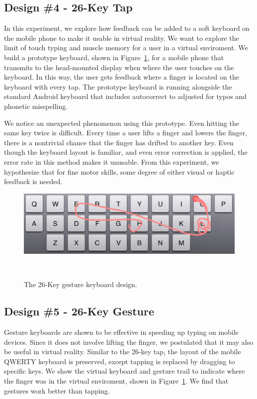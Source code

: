 \subsection{Design \#4 - 26-Key Tap}

In this experiment, we explore how feedback can be added to a soft keyboard on the mobile phone to make it usable in virtual reality.
We want to explore the limit of touch typing and muscle memory for a user in a virtual enviroment.
We build a prototype keyboard, shown in Figure~\ref{fig:gesture}, for a mobile phone that transmits to the head-mounted display when where the user touches on the keyboard.
In this way, the user gets feedback where a finger is located on the keyboard with every tap.
The prototype keyboard is running alongside the standard Android keyboard that includes autocorrect to adjusted for typos and phonetic misspelling.

We notice an unexpected phenomenon using this prototype.
Even hitting the same key twice is difficult.
Every time a user lifts a finger and lowers the finger, there is a nontrivial chance that the finger has drifted to another key.
Even though the keyboard layout is familiar, and even error correction is applied, the error rate in this method makes it unusable.
From this experiment, we hypothesize that for fine motor skills, some degree of either visual or haptic feedback is needed.


\begin{figure}[!htb]
  \centering

  \includegraphics[width=1\columnwidth]{figures/gesture}
  
  \caption{The 26-Key gesture keyboard design.}
  ~\label{fig:gesture}
\end{figure}

\subsection{Design \#5 - 26-Key Gesture}


Gesture keyboards are shown to be effective in speeding up typing on mobile devices.
Since it does not involve lifting the finger, we postulated that it may also be useful in virtual reality.
Similar to the 26-key tap, the layout of the mobile QWERTY keyboard is preserved, except tapping is replaced by dragging to specific keys.
We show the virtual keyboard and gesture trail to indicate where the finger was in the virtual enviroment, shown in Figure~\ref{fig:gesture}.
We find that gestures work better than tapping.  

